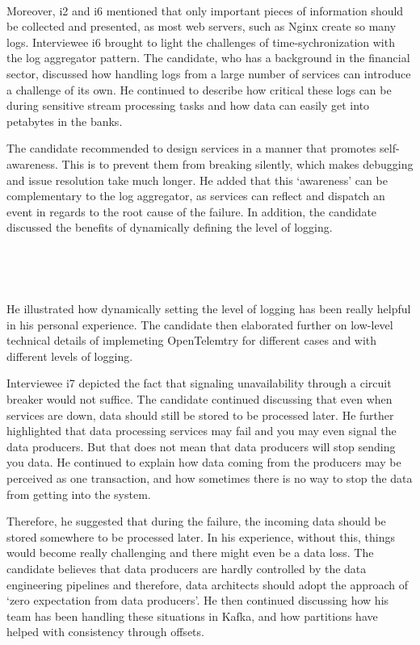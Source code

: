 \documentclass{bmcart}
\begin{document}
\,

Moreover, i2 and i6 mentioned that only important pieces of information should be collected and presented, as most web servers, such as Nginx create so many logs. Interviewee i6 brought to light the challenges of time-sychronization with the log aggregator pattern. The candidate, who has a background in the financial sector, discussed how handling logs from a large number of services can introduce a challenge of its own. He continued to describe how critical these logs can be during sensitive stream processing tasks and how data can easily get into petabytes in the banks. 

The candidate recommended to design services in a manner that promotes self-awareness. This is to prevent them from breaking silently, which makes debugging and issue resolution take much longer. He added that this `awareness' can be complementary to the log aggregator, as services can reflect and dispatch an event in regards to the root cause of the failure. In addition, the candidate discussed the benefits of dynamically defining the level of logging. 

\,

\setlength{\fboxsep}{0.7em}
\noindent{}

\,

He illustrated how dynamically setting the level of logging has been really helpful in his personal experience. The candidate then elaborated further on low-level technical details of implemeting OpenTelemtry \cite{chakraborty2021architecture} for different cases and with different levels of logging.  

Interviewee i7 depicted the fact that signaling unavailability through a circuit breaker would not suffice. The candidate continued discussing that even when services are down, data should still be stored to be processed later. He further highlighted that data processing services may fail and you may even signal the data producers. But that does not mean that data producers will stop sending you data. He continued to explain how data coming from the producers may be perceived as one transaction, and how sometimes there is no way to stop the data from getting into the system. 


Therefore, he suggested that during the failure, the incoming data should be stored somewhere to be processed later. In his experience, without this, things would become really challenging and there might even be a data loss. The candidate believes that data producers are hardly controlled by the data engineering pipelines and therefore, data architects should adopt the approach of `zero expectation from data producers'. He then continued discussing how his team has been handling these situations in Kafka, and how partitions have helped with consistency through offsets. 
\end{document}
